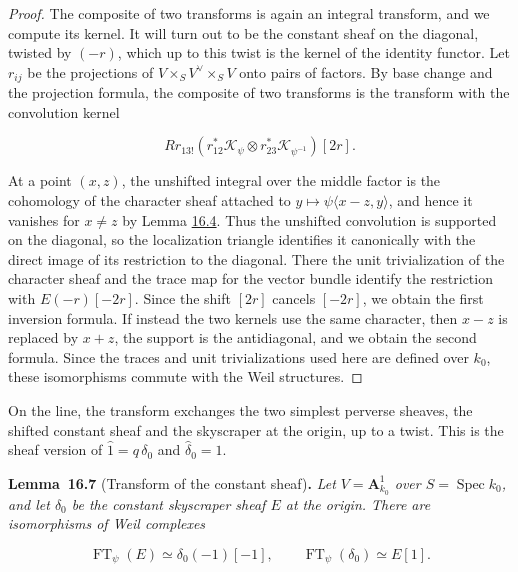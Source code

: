 \documentclass[11pt]{article}
\newenvironment{bpstatement}[2]{\par\addvspace{0.6\baselineskip}\noindent\textbf{#1}#2\textbf{.}\enspace\ignorespaces}
  {\par\addvspace{0.4\baselineskip}}
\newenvironment{bpstatementit}[2]{\begin{bpstatement}{#1}{#2}\itshape\ignorespaces}{\end{bpstatement}}
\begin{document}
\begin{proof}[{Proof}]\label{bp20}%
The composite of two transforms is again an integral transform, and we compute its kernel. It will turn out to be the constant sheaf on the diagonal, twisted by \((-r)\), which up to this twist is the kernel of the identity functor. Let \(r_{ij}\) be the projections of \(V\times_SV^\vee\times_SV\) onto pairs of factors. By base change and the projection formula, the composite of two transforms is the transform with the convolution kernel

\[
Rr_{13!}(r_{12}^*\mathcal K_\psi\otimes
r_{23}^*\mathcal K_{\psi^{-1}})[2r].
\]

At a point \((x,z)\), the unshifted integral over the middle factor is the cohomology of the character sheaf attached to \(y\mapsto\psi\langle x-z,y\rangle\), and hence it vanishes for \(x\ne z\) by Lemma \hyperref[bp13]{16.4}. Thus the unshifted convolution is supported on the diagonal, so the localization triangle identifies it canonically with the direct image of its restriction to the diagonal. There the unit trivialization of the character sheaf and the trace map for the vector bundle identify the restriction with \(E(-r)[-2r]\). Since the shift \([2r]\) cancels \([-2r]\), we obtain the first inversion formula. If instead the two kernels use the same character, then \(x-z\) is replaced by \(x+z\), the support is the antidiagonal, and we obtain the second formula. Since the traces and unit trivializations used here are defined over \(k_0\), these isomorphisms commute with the Weil structures.
\end{proof}

\label{bp21}%
On the line, the transform exchanges the two simplest perverse sheaves, the shifted constant sheaf and the skyscraper at the origin, up to a twist. This is the sheaf version of \(\hat 1=q\,\delta_0\) and \(\hat\delta_0=1\).

\label{bp22}%
\begin{bpstatementit}{Lemma~16.7}{ (Transform of the constant sheaf)}
Let \(V=\mathbf A^1_{k_0}\) over \(S=\operatorname{Spec}k_0\), and let \(\delta_0\) be the constant skyscraper sheaf \(E\) at the origin. There are isomorphisms of Weil complexes

\[
\operatorname{FT}_\psi(E)\simeq\delta_0(-1)[-1],
\qquad \operatorname{FT}_\psi(\delta_0)\simeq E[1].
\]
\end{bpstatementit}
\end{document}
